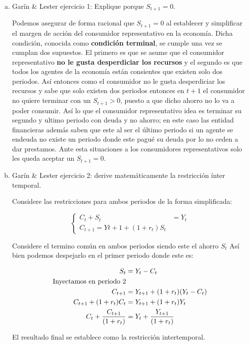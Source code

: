 \begin{enumerate}[a)]
    \item Garín \& Lester ejercicio 1: Explique porque $S_{t+1}=0$.
    
    Podemos asegurar de forma racional que $S_{t+1}=0$ al establecer y simplificar el margen de acción del consumidor representativo en la economía. Dicha condición, conocida como \textbf{condición terminal}, se cumple una vez se cumplan dos supuestos. El primero es que se asume que el consumidor representativo \textbf{no le gusta desperdiciar los recursos} y el segundo es que todos los agentes de la economía están consientes que existen solo dos periodos. Así entonces como el consumidor no le gusta desperdiciar los recursos y sabe que solo existen dos periodos entonces en $t+1$ el consumidor no quiere terminar con un $S_{t+1}>0$, puesto a que dicho ahorro no lo va a poder consumir. Así lo que el consumidor representativo idea es terminar su segundo y ultimo periodo con deuda y no ahorro; en este caso las entidad financieras además saben que este al ser el último periodo si un agente se endeuda no existe un periodo donde este pagué su deuda por lo no ceden a dar prestamos. Ante esta situaciones a los consumidores representativos solo les queda aceptar un  $S_{t+1}=0$.
    
    \item Garín \& Lester ejercicio 2: derive matemáticamente la restricción ínter temporal.
    
    Considere las restricciones para ambos periodos de la forma simplificada: 
    
    \begin{equation*}
        \begin{cases}
            C_{t}+S_{t}&=Y_{t}\\
            C_{t+1}=Y{t+1}+(1+r_{t})S_{t}
        \end{cases}
    \end{equation*}
    
    Considere el termino común en ambos periodos siendo este el ahorro $S_{t}$ Así bien podemos despejarlo en el primer periodo donde este es:
    
    \begin{align*}
        S_{t} & =Y_{t}-C_{t} \\
        \textup{Inyectamos en periodo 2}&\\
        C_{t+1}&= Y_{t+1}+(1+r_{t})(Y_{t}-C_{t})\\
        C_{t+1}+(1+r_{t})C_{t}&= Y_{t+1}+(1+r_{t})Y_{t}\\
        C_{t}+ \frac{ C_{t+1}}{(1+r_{t})} &= Y_{t}+\frac{ Y_{t+1}}{(1+r_{t})} 
    \end{align*}
    
    El resultado final se establece como la restricción intertemporal. 
\end{enumerate}

